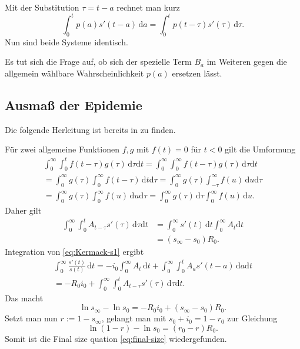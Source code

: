 \documentclass[a4paper,10pt,fleqn,twocolumn,twoside,dvipdfmx]{scrartcl}
\numberwithin{equation}{section}
\begin{document}
Mit der Substitution $\tau = t-a$ rechnet man kurz
\begin{equation}
\int_0^t p(a)s'(t-a)\,\mathrm da = \int_0^t p(t-\tau)s'(\tau)\,\mathrm d\tau.
\end{equation}
Nun sind beide Systeme identisch.

Es tut sich die Frage auf, ob sich der spezielle Term $B_a$ im Weiteren
gegen die allgemein wählbare Wahrscheinlichkeit $p(a)$ ersetzen lässt.

\subsection{Ausmaß der Epidemie}

Die folgende Herleitung ist bereits in \cite{Kermack} zu finden.

Für zwei allgemeine Funktionen $f,g$ mit $f(t)=0$ für $t<0$
gilt die Umformung
\begin{gather*}
\int_0^\infty\!\!\!\int_0^t\! f(t-\tau)g(\tau)\,\mathrm d\tau\mathrm dt
= \int_0^\infty\!\!\!\int_0^\infty\!\! f(t-\tau)g(\tau)\,\mathrm d\tau\mathrm dt\\
= \int_0^\infty \!\!\! g(\tau)\int_0^\infty\!\!\! f(t-\tau)\,\mathrm dt\mathrm d\tau
= \int_0^\infty\!\!\! g(\tau)\int_{-\tau}^{\infty}\!\! f(u)\,\mathrm du\mathrm d\tau\\
= \int_0^\infty\!\! g(\tau)\int_0^\infty\!\! f(u)\,\mathrm du\mathrm d\tau
= \int_0^\infty\!\! g(\tau)\,\mathrm d\tau\int_0^\infty\!\! f(u)\,\mathrm du.
\end{gather*}
Daher gilt
\begin{align*}
\int_0^\infty\!\!\!\int_0^t\! A_{t-\tau}s'(\tau)\,\mathrm d\tau\mathrm dt
&= \int_0^\infty\! s'(t)\,\mathrm dt\int_0^\infty\! A_t\mathrm dt\\
&= (s_\infty-s_0)R_0.
\end{align*}
Integration von \eqref{eq:Kermack-s1} ergibt
\begin{gather*}
\int_0^\infty \frac{s'(t)}{s(t)}\,\mathrm dt = -i_0\int_0^\infty\!\! A_t\,\mathrm dt
+ \int_0^\infty\!\!\!\int_0^t\! A_a s'(t-a)\,\mathrm da\mathrm dt\\
= -R_0 i_0 + \int_0^\infty\!\!\!\int_0^t A_{t-\tau} s'(\tau)\,\mathrm d\tau\mathrm dt.
\end{gather*}
Das macht
\begin{equation}
\ln s_\infty - \ln s_0 = -R_0i_0 + (s_\infty - s_0)R_0.
\end{equation}
Setzt man nun $r:=1-s_\infty$, gelangt man mit $s_0+i_0 = 1-r_0$ zur
Gleichung
\begin{equation}
\ln (1-r) - \ln s_0 = (r_0 - r)R_0.
\end{equation}
Somit ist die Final size quation \eqref{eq:final-size}
wiedergefunden.
\end{document}
